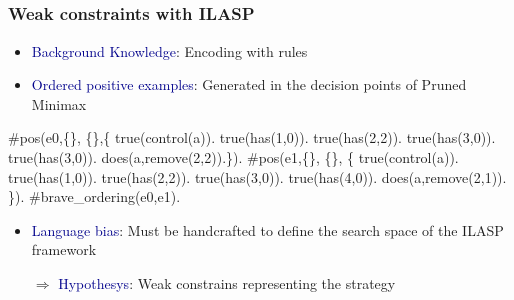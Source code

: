 \documentclass{beamer}
\newcommand\re[1]{\textcolor{darkblue}{#1}}
\begin{document}

\subsection{}
\begin{frame}[fragile]
  \frametitle{Weak constraints with ILASP}
  \footnotesize
  \begin{itemize}[<+->]
    \item \re{Background Knowledge}: Encoding with rules\\
    \item \re{Ordered positive examples}: Generated in the decision points of Pruned Minimax
  \end{itemize}
  \pause
  \begin{example}
    \begin{semiverbatim}
#pos(e0,\{\}, \{\},\{ 
  true(control(a)). true(has(1,0)). true(has(2,2)). 
  true(has(3,0)). true(has(3,0)). does(a,remove(2,2)).\}).
#pos(e1,\{\}, \{\}, \{
  true(control(a)). true(has(1,0)). true(has(2,2)).
  true(has(3,0)). true(has(4,0)). does(a,remove(2,1)). \}).      
#brave_ordering(e0,e1).    
  \end{semiverbatim}
  \end{example}
  \pause
  \begin{itemize}[<+->]
    \item \re{Language bias}: Must be handcrafted to define the search space of the ILASP framework\\
    \item[$\Longrightarrow$] \re{Hypothesys}: Weak constrains representing the strategy
  \end{itemize}
\end{frame}
\end{document}
